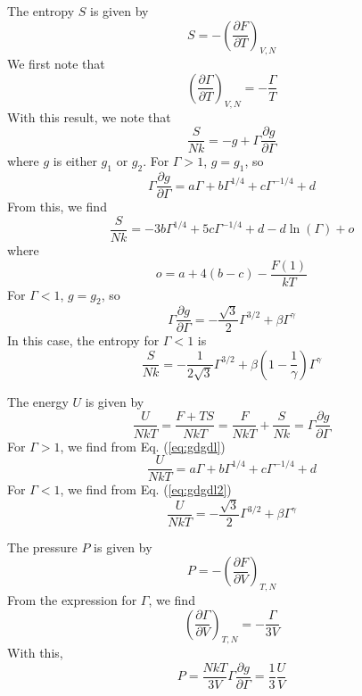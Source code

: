 \documentclass{article}
\begin{document}
The entropy $S$ is given by
\begin{equation}
S = -\left(\frac{\partial F}{\partial T}\right)_{V,N}
\end{equation}
We first note that
\begin{equation}
\left(\frac{\partial \Gamma}{\partial T}\right)_{V,N} = -\frac{\Gamma}{T}
\end{equation}
With this result, we note that
\begin{equation}
\frac{S}{Nk} = -g + \Gamma \frac{\partial g}{\partial \Gamma}
\end{equation}
where $g$ is either $g_1$ or $g_2$.
For $\Gamma > 1$, $g = g_1$, so
\begin{equation}
\Gamma \frac{\partial g}{\partial \Gamma} =
a \Gamma + b \Gamma^{1/4} + c \Gamma^{-1/4} + d
\label{eq:gdgdl}
\end{equation}
From this, we find
\begin{equation}
\frac{S}{Nk} = -3 b \Gamma^{1/4} + 5 c \Gamma^{-1/4} + d - d\ln(\Gamma) + o
\end{equation}
where
\begin{equation}
o = a + 4 (b - c) - \frac{F(1)}{kT}
\end{equation}
For $\Gamma < 1$, $g = g_2$, so
\begin{equation}
\Gamma \frac{\partial g}{\partial \Gamma} =
-\frac{\sqrt{3}}{2} \Gamma^{3/2} + \beta \Gamma^\gamma
\label{eq:gdgdl2}
\end{equation}
In this case, the entropy for $\Gamma < 1$ is
\begin{equation}
\frac{S}{Nk} = -\frac{1}{2\sqrt{3}} \Gamma^{3/2} +
\beta \left( 1 - \frac{1}{\gamma}\right) \Gamma^\gamma
\end{equation}

The energy $U$ is given by
\begin{equation}
\frac{U}{NkT} = \frac{F + TS}{NkT} = \frac{F}{NkT} + \frac{S}{Nk} =
\Gamma \frac{\partial g}{\partial \Gamma}
\end{equation}
For $\Gamma > 1$, we find from Eq. (\ref{eq:gdgdl})
\begin{equation}
\frac{U}{NkT} = 
a \Gamma + b \Gamma^{1/4} + c \Gamma^{-1/4} + d
\end{equation}
For $\Gamma < 1$, we find from Eq. (\ref{eq:gdgdl2})
\begin{equation}
\frac{U}{NkT} = 
-\frac{\sqrt{3}}{2} \Gamma^{3/2} + \beta \Gamma^\gamma
\end{equation}

The pressure $P$ is given by
\begin{equation}
P = -\left( \frac{\partial F}{\partial V}\right)_{T,N}
\end{equation}
From the expression for $\Gamma$, we find
\begin{equation}
\left(\frac{\partial \Gamma}{\partial V}\right)_{T,N} = -\frac{\Gamma}{3V}
\end{equation}
With this,
\begin{equation}
P = \frac{NkT}{3V} \Gamma \frac{\partial g}{\partial \Gamma}
= \frac{1}{3}\frac{U}{V}
\end{equation}
\end{document}
